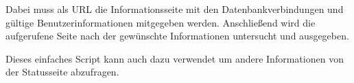 Dabei muss als URL die Informationsseite mit den Datenbankverbindungen und gültige Benutzerinformationen mitgegeben werden.
Anschließend wird die aufgerufene Seite nach der gewünschte Informationen untersucht und ausgegeben.

Dieses einfaches Script kann auch dazu verwendet um andere Informationen von der Statusseite abzufragen.